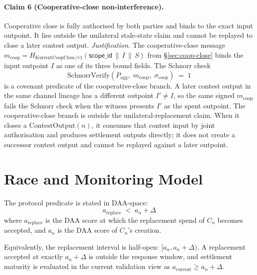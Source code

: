 \documentclass[10pt,a4paper]{article}
\begin{document}
\paragraph{Claim 6 (Cooperative-close non-interference).} Cooperative close is fully authorised by both parties and binds to the exact input outpoint. It lies outside the unilateral stale-state claim and cannot be replayed to close a later contest output. \emph{Justification.} The cooperative-close message $m_{\mathrm{coop}} = H_{\mathrm{KurrentCoopClose/v1}}(\mathsf{scope\_id} \,\|\, I \,\|\, S)$ from \S\ref{sec:coop-close} binds the input outpoint $I$ as one of its three bound fields. The Schnorr check
\[
  \mathrm{SchnorrVerify}(P_{\mathrm{agg}},\; m_{\mathrm{coop}},\; \sigma_{\mathrm{coop}}) \;=\; 1
\]
is a covenant predicate of the cooperative-close branch. A later contest output in the same channel lineage has a different outpoint $I' \neq I$, so the same signed $m_{\mathrm{coop}}$ fails the Schnorr check when the witness presents $I'$ as the spent outpoint. The cooperative-close branch is outside the unilateral-replacement claim. When it closes a $\mathrm{ContestOutput}(n)$, it consumes that contest input by joint authorisation and produces settlement outputs directly; it does not create a successor contest output and cannot be replayed against a later outpoint.



\section{Race and Monitoring Model}
\label{sec:race-monitoring}

The protocol predicate is stated in DAA-space:
\[
  a_{\mathrm{replace}} \;<\; a_n + \Delta
\]
where $a_{\mathrm{replace}}$ is the DAA score at which the replacement spend of $C_n$ becomes accepted, and $a_n$ is the DAA score of $C_n$'s creation.

Equivalently, the replacement interval is half-open: $[a_n, a_n+\Delta)$. A replacement accepted at exactly $a_n+\Delta$ is outside the response window, and settlement maturity is evaluated in the current validation view as $a_{\mathrm{current}} \ge a_n+\Delta$.
\end{document}
